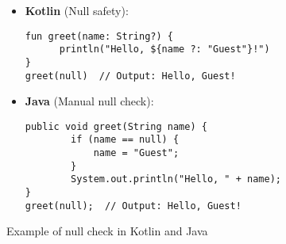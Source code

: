 \begin{figure}[H]
\centering
\begin{tcolorbox}[colframe=blue!80!black, colback=blue!5!white, coltitle=blue!50!black, title={-}, boxrule=0.5mm, width=0.8\textwidth, sharp corners=south]
    \begin{itemize}
    \vspace{0.2cm}
        \item \textbf{\scriptsize Kotlin} \scriptsize (Null safety):
        \begin{lstlisting}[style=kotlin, basicstyle=\scriptsize\ttfamily]
fun greet(name: String?) {
      println("Hello, ${name ?: "Guest"}!")
}
greet(null)  // Output: Hello, Guest!
        \end{lstlisting}
        
        \item \textbf{\scriptsize Java} \scriptsize (Manual null check):
        \begin{lstlisting}[style=java, basicstyle=\scriptsize\ttfamily]
public void greet(String name) {
        if (name == null) {
            name = "Guest";
        }
        System.out.println("Hello, " + name);
}
greet(null);  // Output: Hello, Guest!
        \end{lstlisting}
    \end{itemize}
\end{tcolorbox}
\caption{Example of null check in Kotlin and Java}
\label{fig:null_check}
\end{figure}

